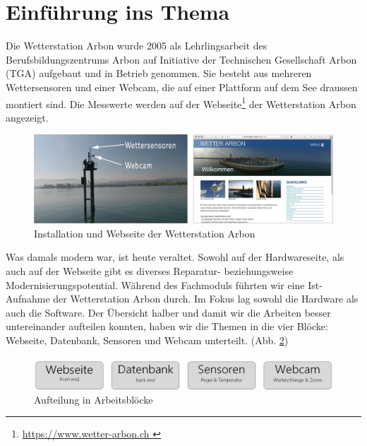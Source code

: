 \section*{Einführung ins Thema}

Die Wetterstation Arbon wurde 2005 als Lehrlingsarbeit des Berufsbildungszentrums Arbon auf Initiative der Technischen Gesellschaft Arbon (TGA) aufgebaut und in Betrieb genommen. Sie besteht aus mehreren Wettersensoren und einer Webcam, die auf einer Plattform auf dem See draussen montiert sind. Die Messwerte werden auf der Webseite\footnote{ \url{https://www.wetter-arbon.ch }}  der Wetterstation Arbon angezeigt.

\begin{figure}[h!]
	\centering
	\includegraphics[width=1\linewidth]{img/kombi}
	\caption{Installation und Webseite der Wetterstation Arbon}
	\label{img:wetterstation}
\end{figure}

Was damals modern war, ist heute veraltet. Sowohl auf der Hardwareseite, als auch auf der Webseite gibt es diverses Reparatur- beziehungsweise Modernisierungspotential. Während des Fachmoduls führten wir eine Ist-Aufnahme der Wetterstation Arbon durch. Im Fokus lag sowohl die Hardware als auch die Software. Der Übersicht halber und damit wir die Arbeiten besser untereinander aufteilen konnten, haben wir die Themen in die vier Blöcke:  Webseite, Datenbank, Sensoren und Webcam unterteilt. (Abb. \ref{img:module})

\vspace{5mm} %

\begin{figure}[h!]
	\centering
	\includegraphics[width=0.8\linewidth]{img/module}
	\caption{Aufteilung in Arbeitsblöcke}
	\label{img:module}
\end{figure}

